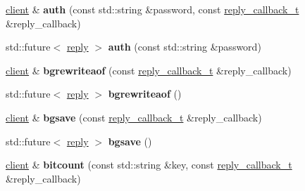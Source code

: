 \begin{DoxyCompactItemize}
\item 
\mbox{\label{classcpp__redis_1_1client_a3ee834ca9c0810d2eafcf04de9dc0670}} 
\hyperlink{classcpp__redis_1_1client}{client} \& {\bfseries auth} (const std\+::string \&password, const \hyperlink{classcpp__redis_1_1client_a061a1140d36d2eaeda82b09a0bb3f9f2}{reply\+\_\+callback\+\_\+t} \&reply\+\_\+callback)
\item 
\mbox{\label{classcpp__redis_1_1client_a899b98d4d6da0ffdf8780933fe088fd1}} 
std\+::future$<$ \hyperlink{classcpp__redis_1_1reply}{reply} $>$ {\bfseries auth} (const std\+::string \&password)
\item 
\mbox{\label{classcpp__redis_1_1client_a9873619c2c1ff820fde17e27ade096c8}} 
\hyperlink{classcpp__redis_1_1client}{client} \& {\bfseries bgrewriteaof} (const \hyperlink{classcpp__redis_1_1client_a061a1140d36d2eaeda82b09a0bb3f9f2}{reply\+\_\+callback\+\_\+t} \&reply\+\_\+callback)
\item 
\mbox{\label{classcpp__redis_1_1client_a82959607f4cbe9dac195d27621a9cc64}} 
std\+::future$<$ \hyperlink{classcpp__redis_1_1reply}{reply} $>$ {\bfseries bgrewriteaof} ()
\item 
\mbox{\label{classcpp__redis_1_1client_a102a4f3572072a5bc26681082ad16a2b}} 
\hyperlink{classcpp__redis_1_1client}{client} \& {\bfseries bgsave} (const \hyperlink{classcpp__redis_1_1client_a061a1140d36d2eaeda82b09a0bb3f9f2}{reply\+\_\+callback\+\_\+t} \&reply\+\_\+callback)
\item 
\mbox{\label{classcpp__redis_1_1client_a632ef40c52f46eb4948768006adfead5}} 
std\+::future$<$ \hyperlink{classcpp__redis_1_1reply}{reply} $>$ {\bfseries bgsave} ()
\item 
\mbox{\label{classcpp__redis_1_1client_aa6c9c15d8676a1cee3d8409ab898a049}} 
\hyperlink{classcpp__redis_1_1client}{client} \& {\bfseries bitcount} (const std\+::string \&key, const \hyperlink{classcpp__redis_1_1client_a061a1140d36d2eaeda82b09a0bb3f9f2}{reply\+\_\+callback\+\_\+t} \&reply\+\_\+callback)
\item 
\mbox{\label{classcpp__redis_1_1client_ac667b96661726874bc237c84de1ddd89}} 

\end{DoxyCompactItemize}

